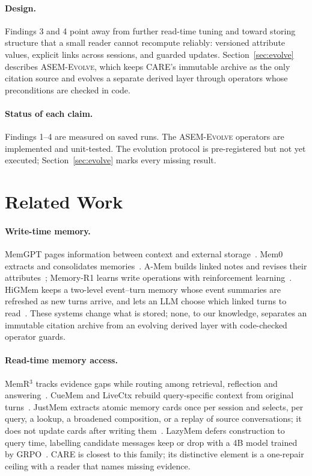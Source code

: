 \documentclass[11pt]{article}
\newcommand{\care}{\textsc{CARE}}
\newcommand{\evolve}{\textsc{ASEM-Evolve}}
\begin{document}
\paragraph{Design.}
Findings 3 and 4 point away from further read-time tuning and toward storing
structure that a small reader cannot recompute reliably: versioned attribute
values, explicit links across sessions, and guarded updates. Section~\ref{sec:evolve}
describes \evolve{}, which keeps \care{}'s immutable archive as the only
citation source and evolves a separate derived layer through operators whose
preconditions are checked in code.

\paragraph{Status of each claim.}
Findings 1--4 are measured on saved runs. The \evolve{} operators are
implemented and unit-tested. The evolution protocol is pre-registered but not
yet executed; Section~\ref{sec:evolve} marks every missing result.

\section{Related Work}
\label{sec:related}

\paragraph{Write-time memory.}
MemGPT pages information between context and external storage~\cite{packer2023memgpt}.
Mem0 extracts and consolidates memories~\cite{chhikara2025mem0}. A-Mem builds
linked notes and revises their attributes~\cite{amem2025}; Memory-R1 learns
write operations with reinforcement learning~\cite{memoryr12025}. HiGMem keeps
a two-level event--turn memory whose event summaries are refreshed as new turns
arrive, and lets an LLM choose which linked turns to read~\cite{cao2026higmem}.
These systems change what is stored; none, to our knowledge, separates an
immutable citation archive from an evolving derived layer with code-checked
operator guards.

\paragraph{Read-time memory access.}
MemR$^3$ tracks evidence gaps while routing among retrieval, reflection and
answering~\cite{du2026memr3}. CueMem and LiveCtx rebuild query-specific
context from original turns~\cite{wang2026cuemem,liu2026livectx}. JustMem
extracts atomic memory cards once per session and selects, per query, a lookup,
a broadened composition, or a replay of source conversations; it does not update
cards after writing them~\cite{chen2026justmem}. LazyMem defers construction to
query time, labelling candidate messages keep or drop with a 4B model trained
by GRPO~\cite{yu2026lazymem}. \care{} is closest to this family; its distinctive
element is a one-repair ceiling with a reader that names missing evidence.
\end{document}

